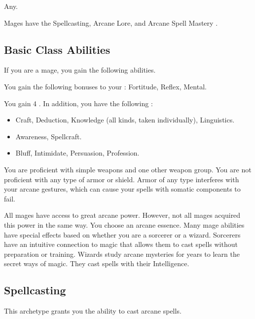      Any.

     Mages have the Spellcasting, Arcane Lore, and Arcane Spell Mastery .

    \subsection{Basic Class Abilities}
        If you are a mage, you gain the following abilities.

        You gain the following bonuses to your :  Fortitude,  Reflex,  Mental.

        You gain 4 .
        In addition, you have the following :
        \begin{itemize}
            \item {} Craft, Deduction, Knowledge (all kinds, taken individually), Linguistics.
            \item {} Awareness, Spellcraft.
            \item {} Bluff, Intimidate, Persuasion, Profession.
        \end{itemize}

        You are proficient with simple weapons and one other weapon group.
        You are not proficient with any type of armor or shield.
        Armor of any type interferes with your arcane gestures, which can cause your spells with somatic components to fail.

        All mages have access to great arcane power.
        However, not all mages acquired this power in the same way.
        You choose an arcane essence.
        Many mage abilities have special effects based on whether you are a sorcerer or a wizard.
         Sorcerers have an intuitive connection to magic that allows them to cast spells without preparation or training.
         Wizards study arcane mysteries for years to learn the secret ways of magic.
        They cast spells with their Intelligence.

    \subsection{Spellcasting}
        This archetype grants you the ability to cast arcane spells.

